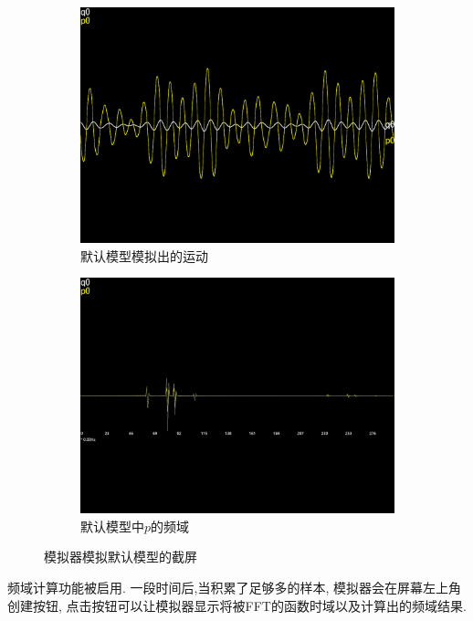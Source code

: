 \documentclass[12pt]{article}
\begin{document}
\begin{figure}[h]
  \centering
  \begin{subfigure}[b]{0.45\linewidth}
    \includegraphics[width=\linewidth]{default_motion.png}
    \caption{默认模型模拟出的运动}
  \end{subfigure}
  \begin{subfigure}[b]{0.45\linewidth}
    \includegraphics[width=\linewidth]{default_p0_frequencies.png}
    \caption{默认模型中$p$的频域}
  \end{subfigure}
  \caption{模拟器模拟默认模型的截屏}
  \label{fig:default}
\end{figure}

频域计算功能被启用.
一段时间后,当积累了足够多的样本,
模拟器会在屏幕左上角创建按钮,
点击按钮可以让模拟器显示将被FFT的函数时域以及计算出的频域结果.
\end{document}

